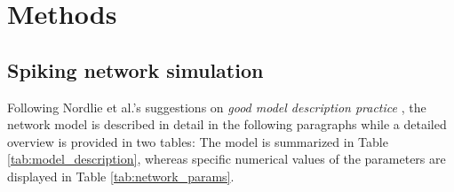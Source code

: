 \section{Methods}
\label{sec:methods}

\subsection{Spiking network simulation}
\label{sub:methods_simulation}
Following Nordlie et al.'s suggestions on 
\emph{good model description practice} \cite{nordlie2009},
the network model is described in detail in the following paragraphs while a detailed 
overview is provided in two tables: The model is summarized in Table 
\ref{tab:model_description}, 
whereas specific numerical values of the parameters are displayed in Table 
\ref{tab:network_params}. 

